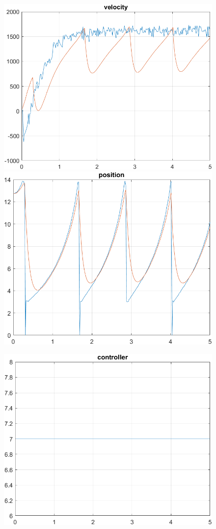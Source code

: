 \begin{figure}[H]
    \centering
    \begin{minipage}{0.45\textwidth}
        \includegraphics[width=\linewidth]{Images/lab4/1/kalo/vel421.png}
    \end{minipage}
    \hfill
    \begin{minipage}{0.45\textwidth}
        \includegraphics[width=\linewidth]{Images/lab4/1/kalo/pos421.png}
    \end{minipage}
\end{figure}
\begin{figure}[H]
    \centering
    \includegraphics[width=0.5\linewidth]{Images/lab4/1/kalo/con421.png}
\end{figure}
